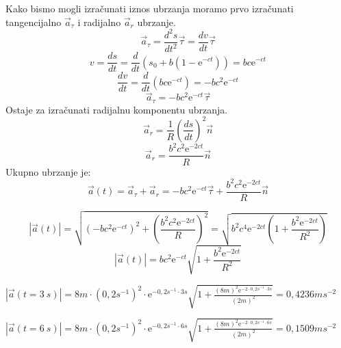 

Kako bismo mogli izračunati iznos ubrzanja moramo prvo izračunati tangencijalno $\vec{a}_{\tau}$ i radijalno $\vec{a}_r$ ubrzanje.
$$ \vec{a}_{\tau}=\frac{d^2s}{dt^2} \vec{\tau} =\frac{dv}{dt} \vec{\tau} $$
$$v=\frac{ds}{dt}=\frac{d}{dt}\left( s_0+b(1-\mathrm{e}^{-ct}) \right)=bc\mathrm{e}^{-ct} $$
$$ \frac{dv}{dt}=\frac{d}{dt}\left( bc\mathrm{e}^{-ct}  \right)=- bc^2\mathrm{e}^{-ct} $$
$$ \vec{a}_{\tau}= - bc^2\mathrm{e}^{-ct} \vec{\tau}$$
Ostaje za izračunati radijalnu komponentu ubrzanja.
$$\vec{a}_r = \frac{1}{R} \left( \frac{ds}{dt} \right)^2\vec{n}  $$
$$\vec{a}_r = \frac{b^2 c^2 \mathrm{e}^{-2ct}}{R} \vec{n}$$
Ukupno ubrzanje je:
$$ \vec{a}(t) = \vec{a}_{\tau}+\vec{a}_r=- bc^2\mathrm{e}^{-ct} \vec{\tau} + \frac{b^2 c^2 \mathrm{e}^{-2ct}}{R} \vec{n} $$

$$ |\vec{a}(t)|= \sqrt{\left(- bc^2\mathrm{e}^{-ct} \right)^2 + \left(\frac{b^2 c^2 \mathrm{e}^{-2ct}}{R} \right)^2} =
\sqrt{b^2c^4 \mathrm{e}^{-2ct}\left(1+\frac{b^2\mathrm{e}^{-2ct}}{R^2}  \right)}$$
$$ |\vec{a}(t)|= bc^2 \mathrm{e}^{-ct}\sqrt{1+\frac{b^2\mathrm{e}^{-2ct}}{R^2} }$$

$|\vec{a}(t=3\ s)|=8m\cdot (0,2s^{-1})^2\cdot \mathrm{e}^{-0,2s^{-1}\cdot3s} \sqrt{1+\frac{(8m)^2 \mathrm{e}^{-2\cdot 0,2s^{-1}\cdot 3s}}{(2m)^2}}=
0,4236ms^{-2}$

$|\vec{a}(t=6\ s)|=8m\cdot (0,2s^{-1})^2\cdot \mathrm{e}^{-0,2s^{-1}\cdot6s} \sqrt{1+\frac{(8m)^2 \mathrm{e}^{-2\cdot 0,2s^{-1}\cdot 6s}}{(2m)^2}}=
0,1509ms^{-2}$
